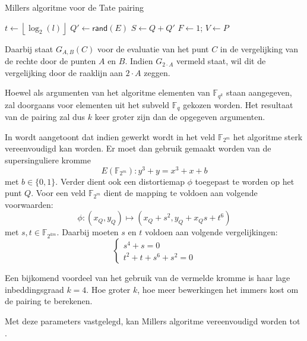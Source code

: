 \begin{algorithm}[h]
	\caption{Millers algoritme voor de Tate pairing}
	\label{algoritme-pairings-miller}
	$t \gets \left\lfloor \log _2 (l) \right\rfloor$\;
	$Q' \gets \textsf{rand}(E)$\;
	$S \gets Q + Q'$\;
	$F \gets 1$; $V \gets P$\;	
\end{algorithm}

Daarbij staat $G_{A, B}(C)$ voor de evaluatie van het punt $C$ in de vergelijking van de rechte door de punten $A$ en $B$. Indien $G_{2 \cdot A}$ vermeld staat, wil dit de vergelijking door de raaklijn aan $2 \cdot A$ zeggen.

Hoewel als argumenten van het algoritme elementen van $\mathbb{F}_{q^k}$ staan aangegeven, zal doorgaans voor elementen uit het subveld $\mathbb{F}_q$ gekozen worden. Het resultaat van de pairing zal dus $k$ keer groter zijn dan de opgegeven argumenten. 

In \cite{barreto-efficient} wordt aangetoont dat indien gewerkt wordt in het veld $\mathbb{F}_{2^m}$ het algoritme sterk vereenvoudigd kan worden. Er moet dan gebruik gemaakt worden van de supersinguliere kromme
\[E(\mathbb{F}_{2^m}): y^3 + y = x^3 + x + b\]
met $b \in \{0, 1\}$. Verder dient ook een distortiemap $\phi$ toegepast te worden op het punt $Q$. Voor een veld $\mathbb{F}_{2^m}$ dient de mapping te voldoen aan volgende voorwaarden:
\[\phi : (x_Q, y_Q) \mapsto (x_Q + s^2, y_Q + x_Q s + t^6)\]
met $s, t \in \mathbb{F}_{2^{km}}$. Daarbij moeten $s$ en $t$ voldoen aan volgende vergelijkingen:
\[\left\{\begin{array}{l}
s^4 + s = 0\\
t^2 + t + s^6 + s^2 = 0
\end{array}\right.\]

Een bijkomend voordeel van het gebruik van de vermelde kromme is haar lage inbeddingsgraad $k = 4$. Hoe groter $k$, hoe meer bewerkingen het immers kost om de pairing te berekenen.

Met deze parameters vastgelegd, kan Millers algoritme vereenvoudigd worden tot .

